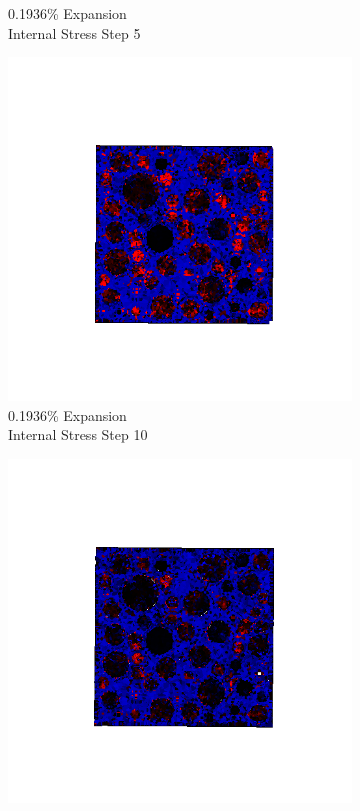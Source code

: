 \begin{figure}[h!]
\begin{subfigure}{.25\textwidth}
      \caption{0.1936\% Expansion\\Internal Stress Step 5}
    \end{subfigure}%
    \begin{subfigure}{.25\textwidth}
      \centering
      \includegraphics[width=1.0\linewidth]{Files/exp_3D/ASR/A30P75_2_s10.png}
      \caption{0.1936\% Expansion\\Internal Stress Step 10}
    \end{subfigure}%
    \begin{subfigure}{.25\textwidth}
      \centering
      \includegraphics[width=1.0\linewidth]{Files/exp_3D/ASR/A30P75_2_s15.png}

\end{subfigure}
\end{figure}
